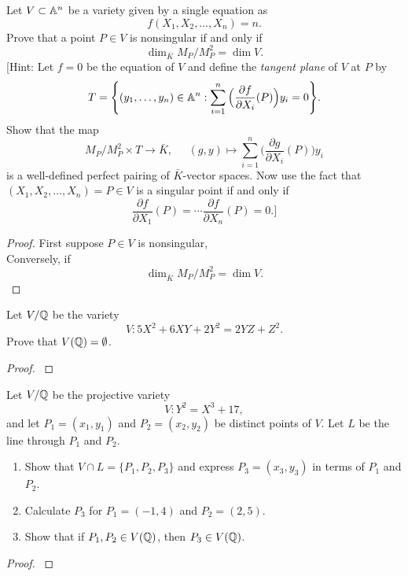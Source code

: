 \documentclass[12pt,reqno]{amsart}
\begin{document}
\begin{exe}
Let $V\subset {\mathbb A}^n$ be a variety given by a single equation as 
\[
f(X_1, X_2, \hdots, X_n)=n.
\]
Prove that a point $P \in V$ is nonsingular if and only if
\[
\dim_{\bar{K}} M_P/M_P^2=\dim V.
\]
[Hint: Let $f=0$ be the equation of $V$ and define the \emph{tangent plane} of $V$ at $P$ by
\[
T=\Bigg\{(y_1,\hdots,y_n)\in{\mathbb A}^n : \sum_{i=1}^n\Big(\frac{\partial f}{\partial X_i}(P)\Big)y_i=0 \Bigg\}.
\]
Show that the map
\[
M_P/M_P^2\times T \longrightarrow \bar{K}, \;\;\;\;\; (g, y)\longmapsto \sum_{i=1}^n\Big(\frac{\partial g}{\partial X_i}(P)\Big)y_i
\]
is a well-defined perfect pairing of $\bar{K}$-vector spaces. Now use the fact that $(X_1, X_2, \hdots, X_n)=P\in V$ is a singular point if and only if 
\[
\frac{\partial f}{\partial X_1}(P)=\cdots \frac{\partial f}{\partial X_n}(P)=0.]
\]
\end{exe}
\begin{proof}
First suppose $P\in V$ is nonsingular, \\
Conversely, if 
\[
\dim_{\bar{K}} M_P/M_P^2=\dim V.
\]
\end{proof}


\begin{exe}\label{1.4}	
Let $V/{\mathbb Q}$ be the variety
\[
V : 5X^2+6XY+2Y^2=2YZ+Z^2.
\]
Prove that $V({\mathbb Q})=\emptyset$.
\begin{proof}\label{s1.4}

\end{proof} 
\end{exe} 

\begin{exe}\label{1.5}
Let $V/{\mathbb Q}$ be the projective variety
\[
V : Y^2=X^3+17,
\]
and let $P_1=(x_1, y_1)$ and $P_2=(x_2, y_2)$ be distinct points of $V$.  Let $L$ be the line through $P_1$ and $P_2$.
\begin{enumerate}
\item\label{1.5a}
Show that $V \cap L=\{P_1, P_2, P_3\}$ and express $P_3=(x_3, y_3)$ in terms of $P_1$ and $P_2$.   
\item\label{1.5b}
Calculate $P_3$ for $P_1=(-1, 4)$ and $P_2=(2, 5)$.
\item\label{1.5c}
Show that if $P_1, P_2 \in V({\mathbb Q})$, then $P_3 \in V({\mathbb Q})$.

\end{enumerate}
\begin{proof}\label{s1.5}

\end{proof} 
\end{exe} 
\end{document}
